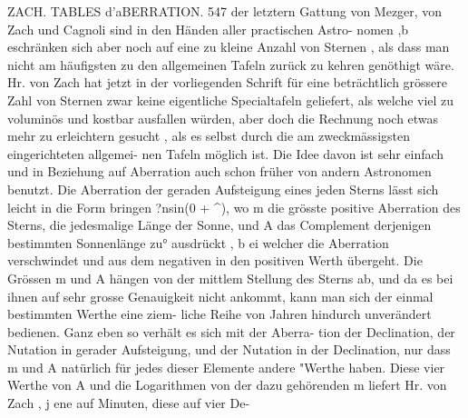 \documentclass[12pt,a4paper]{article}
\begin{document}
\newpage
ZACH. TABLES d'aBERRATION. 547\newline
der letztern Gattung von Mezger, von Zach und Cagnoli sind in den Händen aller practischen Astro-\newline
nomen ,b eschränken sich aber noch auf eine zu kleine Anzahl von Sternen , als dass man nicht am\newline
häufigsten zu den allgemeinen Tafeln zurück zu kehren genöthigt wäre. Hr. von Zach hat jetzt in der\newline
vorliegenden Schrift für eine beträchtlich grössere Zahl von Sternen zwar keine eigentliche Specialtafeln\newline
geliefert, als welche viel zu voluminös und kostbar ausfallen würden, aber doch die Rechnung noch\newline
etwas mehr zu erleichtern gesucht , als es selbst durch die am zweckmässigsten eingerichteten allgemei-\newline
nen Tafeln möglich ist. Die Idee davon ist sehr einfach und in Beziehung auf Aberration auch schon\newline
früher von andern Astronomen benutzt. Die Aberration der geraden Aufsteigung eines jeden Sterns\newline
lässt sich leicht in die Form bringen ?nsin(0 + \^{}), wo m die grösste positive Aberration des Sterns, die jedesmalige Länge der Sonne, und A das Complement derjenigen bestimmten Sonnenlänge zu° ausdrückt , b ei welcher die Aberration verschwindet und aus dem negativen in den positiven Werth\newline
übergeht. Die Grössen m und A hängen von der mittlem Stellung des Sterns ab, und da es bei ihnen\newline
auf sehr grosse Genauigkeit nicht ankommt, kann man sich der einmal bestimmten Werthe eine ziem-\newline
liche Reihe von Jahren hindurch unverändert bedienen. Ganz eben so verhält es sich mit der Aberra-\newline
tion der Declination, der Nutation in gerader Aufsteigung, und der Nutation in der Declination, nur\newline
dass m und A natürlich für jedes dieser Elemente andere "Werthe haben. Diese vier Werthe von A und\newline
die Logarithmen von der dazu gehörenden m liefert Hr. von Zach , j ene auf Minuten, diese auf vier De-\newline
\end{document}

